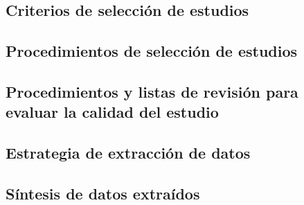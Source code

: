 \documentclass[10pt, twocolumn]{article}
\begin{document}
\subsection{Criterios de selección de estudios}
\paragraph{}

\subsection{Procedimientos de selección de estudios}
\paragraph{}

\subsection{Procedimientos y listas de revisión para evaluar la calidad del estudio}
\paragraph{}

\subsection{Estrategia de extracción de datos}
\paragraph{}

\subsection{Síntesis de datos extraídos}
\end{document}
